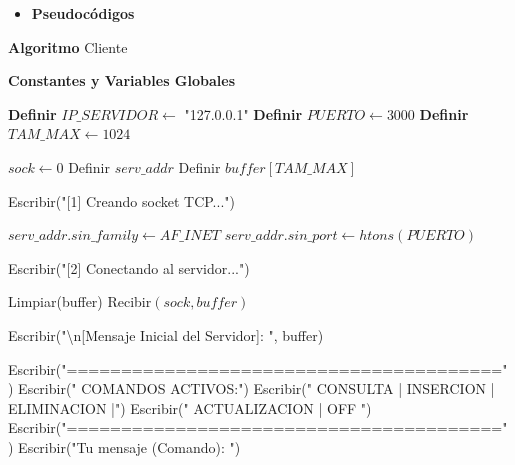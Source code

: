 \begin{itemize}
    \item \textbf{Pseudocódigos}
\end{itemize}

\begin{tcolorbox}[colback=white, colframe=azul_unam, 
title=Pseudocódigo: cliente.c, breakable]

\textbf{Algoritmo} Cliente


\textbf{Constantes y Variables Globales}

\begin{algorithmic}[1]

\State \textbf{Definir} $IP\_SERVIDOR \gets$ "127.0.0.1"
\State \textbf{Definir} $PUERTO \gets 3000$
\State \textbf{Definir} $TAM\_MAX \gets 1024$

\vspace{0.3cm}



\State $sock \gets 0$
\State Definir $serv\_addr$
\State Definir $buffer[TAM\_MAX]$

\State Escribir("[1] Creando socket TCP...")

    \State {}
\EndIf

\State $serv\_addr.sin\_family \gets AF\_INET$
\State $serv\_addr.sin\_port \gets htons(PUERTO)$

    \State {}
\EndIf

\State Escribir("[2] Conectando al servidor...")

    \State {}
\EndIf

\State Limpiar(buffer)
\State Recibir$(sock, buffer)$

\State Escribir("\textbackslash n[Mensaje Inicial del Servidor]: ", buffer)

\vspace{0.2cm}



    \State Escribir("========================================")
    \State Escribir(" COMANDOS ACTIVOS:")
    \State Escribir(" CONSULTA | INSERCION | ELIMINACION |")
    \State Escribir(" ACTUALIZACION | OFF ")
    \State Escribir("========================================")
    \State Escribir("Tu mensaje (Comando): ")


\end{algorithmic}
\end{tcolorbox}
